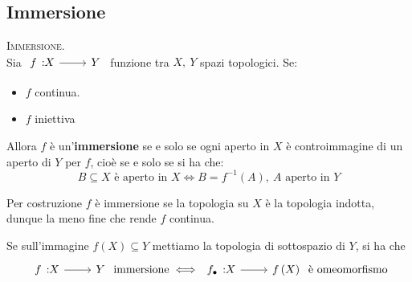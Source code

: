 	\subsection{Immersione} \label{immersione}
\begin{define}\textsc{Immersione.}\\
Sia $\funz{f}{X}{Y}$ funzione tra $X,\ Y$ spazi topologici. Se:\begin{itemize}
\item $f$ continua.
\item $f$ iniettiva
\end{itemize}
Allora $f$ è un'\textbf{immersione} se e solo se ogni aperto in $X$ è controimmagine di un aperto di $Y$ per $f$, cioè se e solo se si ha che: 
\begin{equation}
B\subseteq X\text{ è aperto in }X\iff B=f^{-1}\left(A\right),\ A\text{ aperto in } Y
\end{equation}
\vspace{-6mm}
\end{define}
\begin{observe}\label{omeomorfismoimmersione}
\item Per costruzione $f$ è immersione se la topologia su $X$ è la topologia indotta, dunque la meno fine che rende $f$ continua.
\item Se sull'immagine $f\left(X\right)\subseteq Y$ mettiamo la topologia di sottospazio di $Y$, si ha che
\begin{equation*}
\funz{f}{X}{Y}\text{ immersione}\iff \funz{f_{\bullet}}{X}{f\left(X\right)}\text{ è omeomorfismo}
\end{equation*}
\vspace{-6mm}
\end{observe}
